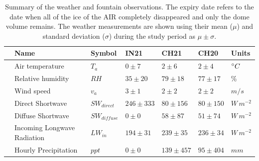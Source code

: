 \documentclass[utf8]{frontiersSCNS}
\begin{document}
\begin{table}
	\centering
  \caption{Summary of the weather and fountain observations. The expiry date refers to the date when  all of the
  ice of the AIR completely disappeared and only the dome volume remains. The weather measurements are shown
using their mean ($\mu$) and standard deviation ($\sigma$) during the study period as $\mu \pm \sigma$. }

	\label{tab:Observations}
	\begin{tabular}{@{}|lllllll|@{}}
		\toprule
		\textbf{}              & \textbf{Name}               & \textbf{Symbol} & \textbf{IN21} &
		\textbf{CH21}          & \textbf{CH20}               & \textbf{Units}                                                              \\ \midrule
		\multicolumn{1}{|l|}{\multirow{9}{*}{\rotatebox[origin=c]{90}{Weather}}}
		                       & Air temperature             & $T_a    $       & $0 \pm 7$     & $2 \pm 6$    & $2
		\pm 4$                 & $\degree C$                                                                                               \\
		\multicolumn{1}{|l|}{} & Relative humidity           & $RH     $       & $35 \pm 20$   & $79 \pm 18$  & $77
		\pm 17$                & \%                                                                                                        \\
		\multicolumn{1}{|l|}{} & Wind speed                  & $v_a        $   & $3 \pm 1$     & $2 \pm 2$    &
		$2 \pm 2$              & $m/s$                                                                                                     \\
		\multicolumn{1}{|l|}{} & Direct Shortwave            & $SW_{direct} $  & $246 \pm 333$ & $80 \pm 156$
		                       & $80 \pm 150$                & $W\,m^{-2}$                                                                 \\
		\multicolumn{1}{|l|}{} & Diffuse Shortwave           & $SW_{diffuse}$  & $0 \pm 0$     & $58 \pm 87$  & $51 \pm 74$  & $W\,m^{-2}$ \\
		\multicolumn{1}{|l|}{} & Incoming Longwave Radiation & $LW_{in}$       & $194 \pm 31$  & $239 \pm 35$ & $236 \pm 34$ & $W\,m^{-2}$ \\
		\multicolumn{1}{|l|}{} & Hourly Precipitation        & $ppt        $   & $0 \pm 0$     & $139 \pm
		457$                   & $95 \pm 404$                & $mm$                                                                        \\

\end{tabular}
\end{table}
\end{document}
